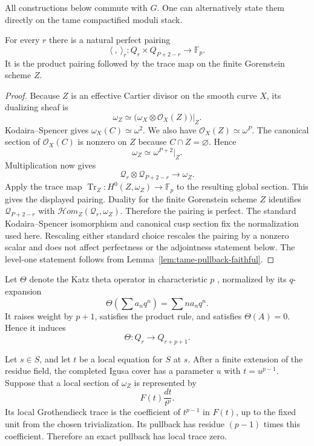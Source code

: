 All constructions below commute with $G$.  One can alternatively state them
directly on the tame compactified moduli stack.

\begin{proposition}
\label{prop:hasse-perfect-pairing}
For every $r$ there is a natural perfect pairing
\[
 \langle\ ,\ \rangle_r:
 Q_r\times Q_{P+2-r}\longrightarrow \mathbb F_p.
\]
It is the product pairing followed by the trace map on the finite
Gorenstein scheme $Z$.
\end{proposition}

\begin{proof}
Because $Z$ is an effective Cartier divisor on the smooth curve $X$, its
dualizing sheaf is
\[
 \omega_Z\simeq\bigl(\omega_X\otimes\mathcal O_X(Z)\bigr)\vert_Z.
\]
Kodaira--Spencer gives $\omega_X(C)\simeq\omega^2$.  We also have
$\mathcal O_X(Z)\simeq\omega^P$.  The canonical section of
$\mathcal O_X(C)$ is nonzero on $Z$ because $C\cap Z=\varnothing$.  Hence
\[
 \omega_Z\simeq\omega^{P+2}\vert_Z.
\]
Multiplication now gives
\[
 \mathcal Q_r\otimes\mathcal Q_{P+2-r}\longrightarrow\omega_Z.
\]
Apply the trace map
$\operatorname{Tr}_Z:H^0(Z,\omega_Z)\to\mathbb F_p$ to the resulting global
section.  This gives the displayed pairing.  Duality for the finite
Gorenstein scheme $Z$ identifies $\mathcal Q_{P+2-r}$ with
$\mathcal Hom_Z(\mathcal Q_r,\omega_Z)$.  Therefore the pairing is perfect.
The standard Kodaira--Spencer isomorphism and canonical cusp section fix
the normalization used here.  Rescaling either standard choice rescales
the pairing by a nonzero scalar and does not affect perfectness or the
adjointness statement below.  The level-one statement follows from
Lemma~\ref{lem:tame-pullback-faithful}.
\end{proof}

Let $\Theta$ denote the Katz theta operator in characteristic $p$
\cite{Katz1977},
normalized by its $q$-expansion
\[
 \Theta\!\left(\sum a_nq^n\right)=\sum n a_nq^n.
\]
It raises weight by $p+1$, satisfies the product rule, and satisfies
$\Theta(A)=0$.  Hence it induces
\[
\Theta:Q_r\longrightarrow Q_{r+p+1}.
\]

\begin{lemma}
\label{lem:trace-igusa-residue}
Let $s\in S$, and let $t$ be a local equation for $S$ at $s$.  After a finite
extension of the residue field, the completed Igusa cover has a parameter
$u$ with $t=u^{p-1}$.  Suppose that a local section of $\omega_Z$ is
represented by
\[
 F(t)\frac{dt}{t^p}.
 \]
Its local Grothendieck trace is the coefficient of $t^{p-1}$ in $F(t)$, up to
the fixed unit from the chosen trivialization.  Its pullback has residue
$(p-1)$ times this coefficient.  Therefore an exact pullback has local trace
zero.
\end{lemma}

